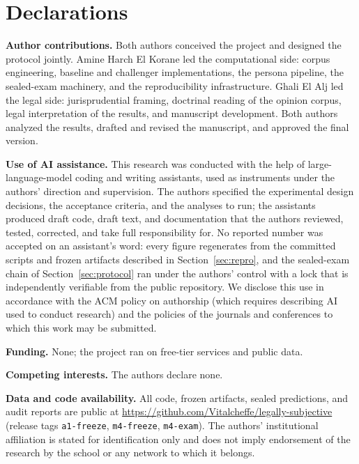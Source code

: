 \documentclass[11pt,a4paper]{article}
\begin{document}











\vspace{6pt}
\section*{Declarations}
\noindent\textbf{Author contributions.}
Both authors conceived the project and designed the protocol
jointly. Amine Harch El Korane led the computational side:
corpus engineering, baseline and challenger implementations,
the persona pipeline, the sealed-exam machinery, and the
reproducibility infrastructure. Ghali El Alj led the legal side:
jurisprudential framing, doctrinal reading of the opinion
corpus, legal interpretation of the results, and manuscript
development. Both authors analyzed the results, drafted and
revised the manuscript, and approved the final version.

\medskip
\noindent\textbf{Use of AI assistance.}
This research was conducted with the help of large-language-model
coding and writing assistants, used as instruments under the
authors' direction and supervision. The authors specified the
experimental design decisions, the acceptance criteria, and the
analyses to run; the assistants produced draft code, draft text,
and documentation that the authors reviewed, tested, corrected,
and take full responsibility for. No reported number was accepted
on an assistant's word: every figure regenerates from the
committed scripts and frozen artifacts described in
Section~\ref{sec:repro}, and the sealed-exam chain of
Section~\ref{sec:protocol} ran under the authors' control with a
lock that is independently verifiable from the public repository.
We disclose this use in accordance with the ACM policy on
authorship (which requires describing AI used to conduct
research) and the policies of the journals and conferences to
which this work may be submitted.

\medskip
\noindent\textbf{Funding.} None; the project ran on free-tier
services and public data.

\medskip
\noindent\textbf{Competing interests.} The authors declare none.

\medskip
\noindent\textbf{Data and code availability.}
All code, frozen artifacts, sealed predictions, and audit reports
are public at
\url{https://github.com/Vitalcheffe/legally-subjective}
(release tags \texttt{a1-freeze}, \texttt{m4-freeze},
\texttt{m4-exam}). The authors' institutional affiliation is
stated for identification only and does not imply endorsement
of the research by the school or any network to which it
belongs.


\end{document}
